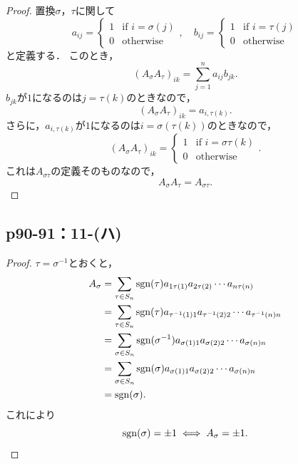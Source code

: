 \documentclass[a4paper,10pt,fleqn]{ltjsarticle}
\begin{document}
\begin{tleftbar}
    \begin{proof}
        置換$\sigma$，$\tau$に関して
        \[
            a_{ij} =
            \begin{cases}
                1 & \text{if } i = \sigma(j) \\
                0 & \text{otherwise}
            \end{cases},
            \quad
            b_{ij}=
            \begin{cases}
                1 & \text{if } i = \tau(j) \\
                0 & \text{otherwise}
            \end{cases}
        \]
        と定義する．
        このとき，
        \[
            (A_\sigma A_\tau)_{ik} = \sum_{j=1}^n a_{ij} b_{jk}.
        \]
        $b_{jk}$が$1$になるのは$j= \tau(k)$のときなので，
        \[
            (A_\sigma A_\tau)_{ik} = a_{i, \tau(k)}.
        \]
        さらに，$a_{i, \tau(k)}$が$1$になるのは$i = \sigma(\tau(k))$のときなので，
        \[
            (A_\sigma A_\tau)_{ik} =
            \begin{cases}
                1 & \text{if } i=\sigma \tau(k) \\
                0 & \text{otherwise}
            \end{cases}.
        \]
        これは$A_{\sigma \tau}$の定義そのものなので，
        \[
            A_\sigma A_\tau = A_{\sigma \tau}.
        \]
    \end{proof}
\end{tleftbar}


\subsection*{p90-91：11-(ハ)}

\begin{tleftbar}
    \begin{proof}
        $ \tau = \sigma^{-1}$とおくと，
        \begin{align*}
            A_\sigma & = \sum_{ \tau \in S_n} \operatorname{sgn}  (\tau) a_{1 \tau(1)} a_{2 \tau(2)} \cdots a_{n \tau(n)}               \\
                     & = \sum_{ \tau \in S_n} \operatorname{sgn}  (\tau) a_{\tau^{-1}(1)1} a_{\tau^{-1} (2)2} \cdots a_{\tau^{-1} (n)n} \\
                     & = \sum_{\sigma \in S_n} \operatorname{sgn} (\sigma^{-1}) a_{\sigma(1)1} a_{\sigma(2)2} \cdots a_{\sigma(n)n}     \\
                     & = \sum_{\sigma \in S_n} \operatorname{sgn} (\sigma) a_{\sigma(1)1} a_{\sigma(2)2} \cdots a_{\sigma(n)n}          \\
                     & = \operatorname{sgn} (\sigma).
        \end{align*}
        これにより
        \[
            \operatorname{sgn} (\sigma) = \pm 1 \iff A_\sigma = \pm 1.
        \]
    \end{proof}
\end{tleftbar}
\newpage
\end{document}
